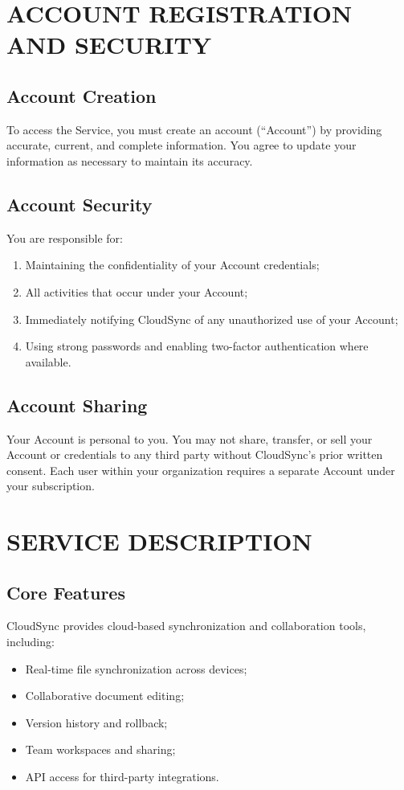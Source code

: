 \documentclass[
    language=english,
    doctype=terms-of-service,
    institution=none,
]{../../omnilatex}
\begin{document}
\section{ACCOUNT REGISTRATION AND SECURITY}

\subsection{Account Creation}
To access the Service, you must create an account (``Account'') by providing accurate, current, and complete information. You agree to update your information as necessary to maintain its accuracy.

\subsection{Account Security}
You are responsible for:
\begin{enumerate}[label=(\alph*)]
    \item Maintaining the confidentiality of your Account credentials;
    \item All activities that occur under your Account;
    \item Immediately notifying CloudSync of any unauthorized use of your Account;
    \item Using strong passwords and enabling two-factor authentication where available.
\end{enumerate}

\subsection{Account Sharing}
Your Account is personal to you. You may not share, transfer, or sell your Account or credentials to any third party without CloudSync's prior written consent. Each user within your organization requires a separate Account under your subscription.

\section{SERVICE DESCRIPTION}

\subsection{Core Features}
CloudSync provides cloud-based synchronization and collaboration tools, including:
\begin{itemize}
    \item Real-time file synchronization across devices;
    \item Collaborative document editing;
    \item Version history and rollback;
    \item Team workspaces and sharing;
    \item API access for third-party integrations.
\end{itemize}
\end{document}
